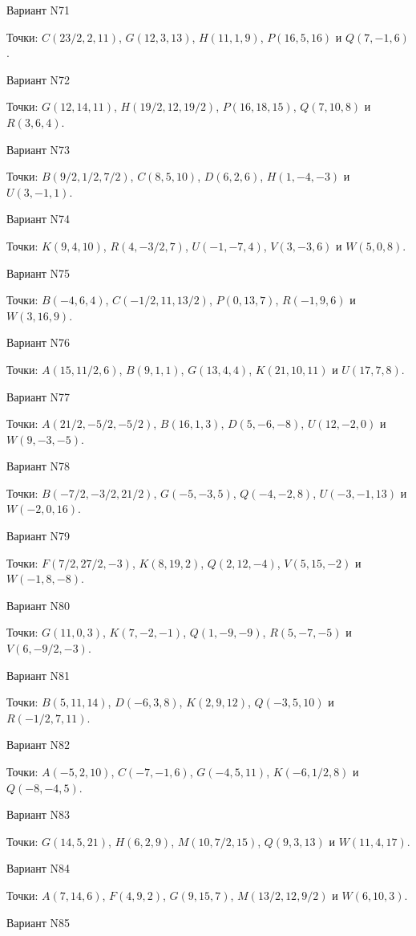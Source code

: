 \documentclass[11pt]{report}
\begin{document}
Вариант N71

Точки: $C(23/2, 2, 11)$, $G(12, 3, 13)$, $H(11, 1, 9)$, $P(16, 5, 16)$ и $Q(7, -1, 6)$.

Вариант N72

Точки: $G(12, 14, 11)$, $H(19/2, 12, 19/2)$, $P(16, 18, 15)$, $Q(7, 10, 8)$ и $R(3, 6, 4)$.

Вариант N73

Точки: $B(9/2, 1/2, 7/2)$, $C(8, 5, 10)$, $D(6, 2, 6)$, $H(1, -4, -3)$ и $U(3, -1, 1)$.

Вариант N74

Точки: $K(9, 4, 10)$, $R(4, -3/2, 7)$, $U(-1, -7, 4)$, $V(3, -3, 6)$ и $W(5, 0, 8)$.

Вариант N75

Точки: $B(-4, 6, 4)$, $C(-1/2, 11, 13/2)$, $P(0, 13, 7)$, $R(-1, 9, 6)$ и $W(3, 16, 9)$.

Вариант N76

Точки: $A(15, 11/2, 6)$, $B(9, 1, 1)$, $G(13, 4, 4)$, $K(21, 10, 11)$ и $U(17, 7, 8)$.

Вариант N77

Точки: $A(21/2, -5/2, -5/2)$, $B(16, 1, 3)$, $D(5, -6, -8)$, $U(12, -2, 0)$ и $W(9, -3, -5)$.

Вариант N78

Точки: $B(-7/2, -3/2, 21/2)$, $G(-5, -3, 5)$, $Q(-4, -2, 8)$, $U(-3, -1, 13)$ и $W(-2, 0, 16)$.

Вариант N79

Точки: $F(7/2, 27/2, -3)$, $K(8, 19, 2)$, $Q(2, 12, -4)$, $V(5, 15, -2)$ и $W(-1, 8, -8)$.

Вариант N80

Точки: $G(11, 0, 3)$, $K(7, -2, -1)$, $Q(1, -9, -9)$, $R(5, -7, -5)$ и $V(6, -9/2, -3)$.

Вариант N81

Точки: $B(5, 11, 14)$, $D(-6, 3, 8)$, $K(2, 9, 12)$, $Q(-3, 5, 10)$ и $R(-1/2, 7, 11)$.

Вариант N82

Точки: $A(-5, 2, 10)$, $C(-7, -1, 6)$, $G(-4, 5, 11)$, $K(-6, 1/2, 8)$ и $Q(-8, -4, 5)$.

Вариант N83

Точки: $G(14, 5, 21)$, $H(6, 2, 9)$, $M(10, 7/2, 15)$, $Q(9, 3, 13)$ и $W(11, 4, 17)$.

Вариант N84

Точки: $A(7, 14, 6)$, $F(4, 9, 2)$, $G(9, 15, 7)$, $M(13/2, 12, 9/2)$ и $W(6, 10, 3)$.

Вариант N85
\end{document}
